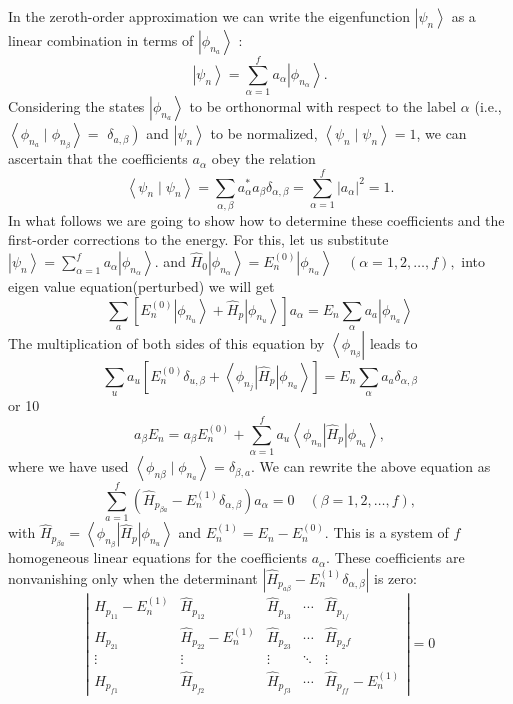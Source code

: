 In the zeroth-order approximation we can write the eigenfunction $\left|\psi_{n}\right\rangle$ as a linear combination in terms of $\left|\phi_{n_{a}}\right\rangle$ :
$$
\left|\psi_{n}\right\rangle=\sum_{\alpha=1}^{f} a_{\alpha}\left|\phi_{n_{\alpha}}\right\rangle .
$$
Considering the states $\left|\phi_{n_{a}}\right\rangle$ to be orthonormal with respect to the label $\alpha$ (i.e., $\left\langle\phi_{n_{a}} \mid \phi_{n_{\beta}}\right\rangle=$ $\left.\delta_{a, \beta}\right)$ and $\left|\psi_{n}\right\rangle$ to be normalized, $\left\langle\psi_{n} \mid \psi_{n}\right\rangle=1$, we can ascertain that the coefficients $a_{\alpha}$ obey the relation
$$
\left\langle\psi_{n} \mid \psi_{n}\right\rangle=\sum_{\alpha, \beta} a_{\alpha}^{*} a_{\beta} \delta_{\alpha, \beta}=\sum_{\alpha=1}^{f}\left|a_{\alpha}\right|^{2}=1 .
$$
In what follows we are going to show how to determine these coefficients and the first-order corrections to the energy. For this, let us substitute $
\left|\psi_{n}\right\rangle=\sum_{\alpha=1}^{f} a_{\alpha}\left|\phi_{n_{\alpha}}\right\rangle .
$ and $
\hat{H}_{0}\left|\phi_{n_{\alpha}}\right\rangle=E_{n}^{(0)}\left|\phi_{n_{\alpha}}\right\rangle \quad(\alpha=1,2, \ldots, f),
$ into eigen value equation(perturbed) we will get
$$
\sum_{a}\left[E_{n}^{(0)}\left|\phi_{n_{u}}\right\rangle+\hat{H}_{p}\left|\phi_{n_{u}}\right\rangle\right] a_{\alpha}=E_{n} \sum_{\alpha} a_{a}\left|\phi_{n_{a}}\right\rangle
$$
The multiplication of both sides of this equation by $\left\langle\phi_{n_{\beta}}\right|$ leads to
$$
\sum_{u} a_{u}\left[E_{n}^{(0)} \delta_{u, \beta}+\left\langle\phi_{n_{j}}\left|\hat{H}_{p}\right| \phi_{n_{a}}\right\rangle\right]=E_{n} \sum_{\alpha} a_{a} \delta_{\alpha, \beta}
$$
or 10
$$
a_{\beta} E_{n}=a_{\beta} E_{n}^{(0)}+\sum_{\alpha=1}^{f} a_{u}\left\langle\phi_{n_{n}}\left|\hat{H}_{p}\right| \phi_{n_{a}}\right\rangle,
$$
where we have used $\left\langle\phi_{n \beta} \mid \phi_{n_{a}}\right\rangle=\delta_{\beta, a}$. We can rewrite the above equation as 
$$
\sum_{a=1}^{f}\left(\hat{H}_{p_{\beta a}}-E_{n}^{(1)} \delta_{\alpha, \beta}\right) a_{\alpha}=0 \quad(\beta=1,2, \ldots, f),
$$
with $\hat{H}_{p_{\beta a}}=\left\langle\phi_{n_{\beta}}\left|\hat{H}_{p}\right| \phi_{n_{u}}\right\rangle$ and $E_{n}^{(1)}=E_{n}-E_{n}^{(0)}$. This is a system of $f$ homogeneous linear equations for the coefficients $a_{\alpha}$. These coefficients are nonvanishing only when the determinant $\left|\hat{H}_{p_{a \beta}}-E_{n}^{(1)} \delta_{\alpha, \beta}\right|$ is zero:
$$\left|\begin{array}{ccccc}
	\hat{H}_{p_{11}}-E_{n}^{(1)} & \hat{H}_{p_{12}} & \hat{H}_{p_{13}} & \cdots & \hat{H}_{p_{1 /}} \\
	\hat{H}_{p_{21}} & \hat{H}_{p_{22}}-E_{n}^{(1)} & \hat{H}_{p_{23}} & \cdots & \hat{H}_{p_{2} f} \\
	\vdots & \vdots & \vdots & \ddots & \vdots \\
	\hat{H}_{p_{f 1}} & \hat{H}_{p_{f 2}} & \hat{H}_{p_{f 3}} & \cdots & \hat{H}_{p_{f f}}-E_{n}^{(1)}
\end{array}\right|=0$$
